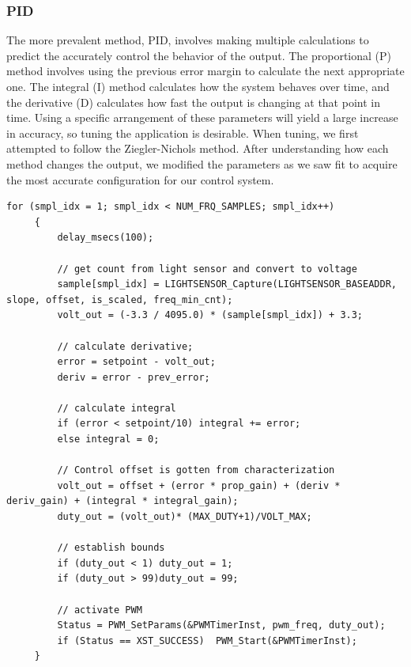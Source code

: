 \documentclass[11pt]{article}
\begin{document}
\subsubsection{PID}
The more prevalent method, PID, involves making multiple calculations to predict the accurately control the behavior of the output.  The proportional (P) method involves using the previous error margin to calculate the next appropriate one.  The integral (I) method calculates how the system behaves over time, and the derivative (D) calculates how fast the output is changing at that point in time.
Using a specific arrangement of these parameters will yield a large increase in accuracy, so tuning the application is desirable.  When tuning, we first attempted to follow the Ziegler-Nichols method.  After understanding how each method changes the output, we modified the parameters as we saw fit to acquire the most accurate configuration for our control system.

\vspace{12pt}

 \begin{lstlisting}[caption=PID Algorithm, label=PID]		
     for (smpl_idx = 1; smpl_idx < NUM_FRQ_SAMPLES; smpl_idx++)
     {
         delay_msecs(100);
 
         // get count from light sensor and convert to voltage 
         sample[smpl_idx] = LIGHTSENSOR_Capture(LIGHTSENSOR_BASEADDR, slope, offset, is_scaled, freq_min_cnt);
         volt_out = (-3.3 / 4095.0) * (sample[smpl_idx]) + 3.3;

         // calculate derivative;
         error = setpoint - volt_out;
         deriv = error - prev_error;
 
         // calculate integral
         if (error < setpoint/10) integral += error;
         else integral = 0; 
 
         // Control offset is gotten from characterization
         volt_out = offset + (error * prop_gain) + (deriv * deriv_gain) + (integral * integral_gain);
         duty_out = (volt_out)* (MAX_DUTY+1)/VOLT_MAX;
 
         // establish bounds
         if (duty_out < 1) duty_out = 1;
         if (duty_out > 99)duty_out = 99;
 
         // activate PWM
         Status = PWM_SetParams(&PWMTimerInst, pwm_freq, duty_out);
         if (Status == XST_SUCCESS)	 PWM_Start(&PWMTimerInst);
     } 
  \end{lstlisting}
  
  
\end{document}
